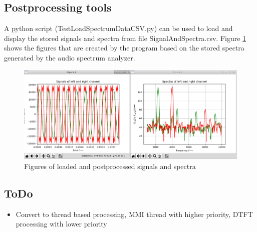 \documentclass[11pt, oneside]{scrartcl}   	%
\begin{document}
\subsection{Postprocessing tools}
A python script (TestLoadSpectrumDataCSV.py) can be used to load and display the stored signals and spectra from file SignalAndSpectra.csv.
Figure \ref{fig:TestLoadSpectraCSVDisplays} shows the figures that are created by the program based on the stored spectra generated by the audio spectrum analyzer.
\begin{figure}[tbph]
	\centering
	\includegraphics[width=\linewidth]{TestLoadSpectraCSVDisplays.png}
	\caption[Figures of loaded and postprocessed signals and spectra]{Figures of loaded and postprocessed signals and spectra}
	\label{fig:TestLoadSpectraCSVDisplays}
\end{figure}

\subsection{ToDo}
\begin{itemize}
	\item Convert to thread based processing, MMI thread with higher priority, DTFT processing with lower priority
\end{itemize}
\end{document}
